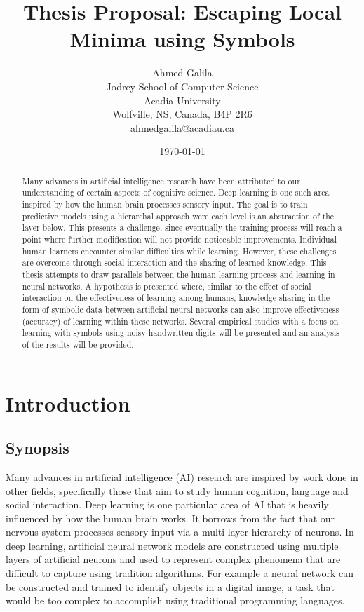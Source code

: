 \documentclass{article}
\title{Thesis Proposal: Escaping Local Minima using Symbols}
\author{Ahmed Galila\\ Jodrey School of Computer Science\\ Acadia University\\ Wolfville, NS, Canada, B4P 2R6\\ ahmedgalila@acadiau.ca}
\date{\today}
\begin{document}
	
	\maketitle
	
	\onehalfspace
	\setlength{\parskip}{\baselineskip}
	
	\begin{abstract}
		
		Many advances in artificial intelligence research have been attributed to our understanding of certain aspects of cognitive science. Deep learning is one such area inspired by how the human brain processes sensory input. The goal is to train predictive models using a hierarchal approach were each level is an abstraction of the layer below. This presents a challenge, since eventually the training process will reach a point where further modification will not provide noticeable improvements. Individual human learners encounter similar difficulties while learning. However, these challenges are overcome through social interaction and the sharing of learned knowledge. This thesis attempts to draw parallels between the human learning process and learning in neural networks. A hypothesis is presented where, similar to the effect of social interaction on the effectiveness of learning among humans, knowledge sharing in the form of symbolic data between artificial neural networks can also improve effectiveness (accuracy) of learning within these networks. Several empirical studies with a focus on learning with symbols using noisy handwritten digits will be presented and an analysis of the results will be provided. 
		
	\end{abstract}
	
	\section{Introduction}
	
	\subsection{Synopsis} \label{sec:introduction-synopsis}
	
	Many advances in artificial intelligence (AI) research are inspired by work done in other fields, specifically those that aim to study human cognition, language and social interaction\cite{DBLP:journals/corr/abs-1203-2990}. Deep learning is one particular area of AI that is heavily influenced by how the human brain works. It borrows from the fact that our nervous system processes sensory input via a multi layer hierarchy of neurons\cite{DBLP:journals/corr/abs-1203-2990}. In deep learning, artificial neural network models are constructed using multiple layers of artificial neurons and used to represent complex phenomena that are difficult to capture using tradition algorithms\cite{Bengio:2009:LDA:1658423.1658424}. For example a neural network can be constructed and trained to identify objects in a digital image, a task that would be too complex to accomplish using traditional programming languages.
	
\end{document}
